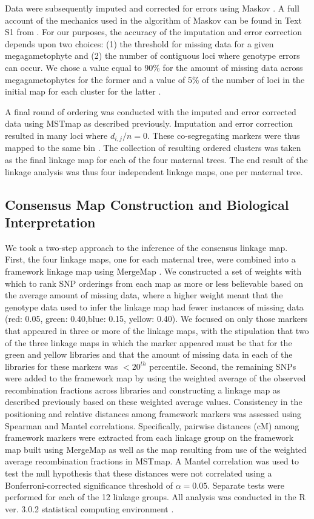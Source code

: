\documentclass[smallextended]{svjour3}
\begin{document}
Data were subsequently imputed and corrected for errors using Maskov
\citep{Ward:2013}. A full account of the mechanics used in the algorithm of
Maskov can be found in Text S1 from \citet{Ward:2013}. For our purposes, the
accuracy of the imputation and error correction depends upon two choices: (1)
the threshold for missing data for a given megagametophyte and (2) the number of
contiguous loci where genotype errors can occur. We chose a value equal to 90\%
for the amount of missing data across megagametophytes for the former and a
value of 5\% of the number of loci in the initial map for each cluster for the
latter \citep[cf.,][]{Ward:2013}.

A final round of ordering was conducted with the imputed and error corrected
data using MSTmap as described previously. Imputation and error correction
resulted in many loci where $d_{i,j}/n = 0$. These co-segregating markers were
thus mapped to the same bin \citep{Wu:2008a}. The collection of resulting
ordered clusters was taken as the final linkage map for each of the four
maternal trees.  The end result of the linkage analysis was thus four
independent linkage maps, one per maternal tree.

\subsection*{Consensus Map Construction and Biological
  Interpretation}\label{ss:consensus}
We took a two-step approach to the inference of the consensus linkage
map. First, the four linkage maps, one for each maternal tree, were combined
into a framework linkage map using MergeMap \citep{Wu:2008b}.  We constructed a
set of weights with which to rank SNP orderings from each map as more or less
believable based on the average amount of missing data, where a higher weight
meant that the genotype data used to infer the linkage map had fewer instances
of missing data (red: 0.05, green: 0.40,blue: 0.15, yellow: 0.40). We focused on
only those markers that appeared in three or more of the linkage maps, with the
stipulation that two of the three linkage maps in which the marker appeared must
be that for the green and yellow libraries and that the amount of missing data
in each of the libraries for these markers was $< 20^{th}$ percentile. Second,
the remaining SNPs were added to the framework map by using the weighted average
of the observed recombination fractions across libraries and constructing a
linkage map as described previously based on these weighted average
values. Consistency in the positioning and relative distances among framework
markers was assessed using Spearman \citep{Spearman:1904} and Mantel
\citep{Mantel:1967} correlations. Specifically, pairwise distances (cM) among
framework markers were extracted from each linkage group on the framework map
built using MergeMap as well as the map resulting from use of the weighted
average recombination fractions in MSTmap.  A Mantel correlation was used to
test the null hypothesis that these distances were not correlated using a
Bonferroni-corrected significance threshold of $\alpha = 0.05$. Separate tests
were performed for each of the 12 linkage groups. All analysis was conducted in
the R ver. 3.0.2 statistical computing environment \citep{R:2013}.
\end{document}
